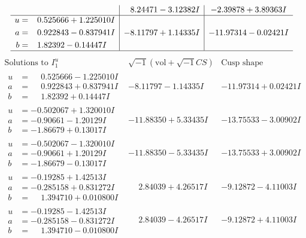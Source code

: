 \documentclass[1p]{elsarticle_modified}
\theoremstyle{definition}
\newcommand{\I}{\sqrt{-1}}
\begin{document}
$$\begin{array}{c|c|c}
 & \phantom{-}8.24471 - 3.12382 I & -2.39878 + 3.89363 I \\ \hline\begin{aligned}
u &= \phantom{-}0.525666 + 1.225010 I \\
a &= \phantom{-}0.922843 - 0.837941 I \\
b &= \phantom{-}1.82392 - 0.14447 I\end{aligned}
 & -8.11797 + 1.14335 I & -11.97314 - 0.02421 I\\
 \hline 
 \end{array}$$\newpage$$\begin{array}{c|c|c}  
\text{Solutions to }I^u_{1}& \I (\text{vol} + \sqrt{-1}CS) & \text{Cusp shape}\\
 \hline 
\begin{aligned}
u &= \phantom{-}0.525666 - 1.225010 I \\
a &= \phantom{-}0.922843 + 0.837941 I \\
b &= \phantom{-}1.82392 + 0.14447 I\end{aligned}
 & -8.11797 - 1.14335 I & -11.97314 + 0.02421 I \\ \hline\begin{aligned}
u &= -0.502067 + 1.320010 I \\
a &= -0.90661 - 1.20129 I \\
b &= -1.86679 + 0.13017 I\end{aligned}
 & -11.88350 + 5.33435 I & -13.75533 - 3.00902 I \\ \hline\begin{aligned}
u &= -0.502067 - 1.320010 I \\
a &= -0.90661 + 1.20129 I \\
b &= -1.86679 - 0.13017 I\end{aligned}
 & -11.88350 - 5.33435 I & -13.75533 + 3.00902 I \\ \hline\begin{aligned}
u &= -0.19285 + 1.42513 I \\
a &= -0.285158 + 0.831272 I \\
b &= \phantom{-}1.394710 + 0.010800 I\end{aligned}
 & \phantom{-}2.84039 + 4.26517 I & -9.12872 - 4.11003 I \\ \hline\begin{aligned}
u &= -0.19285 - 1.42513 I \\
a &= -0.285158 - 0.831272 I \\
b &= \phantom{-}1.394710 - 0.010800 I\end{aligned}
 & \phantom{-}2.84039 - 4.26517 I & -9.12872 + 4.11003 I \\ \hline\begin{aligned}

\end{aligned}
\end{array}$$
\end{document}
